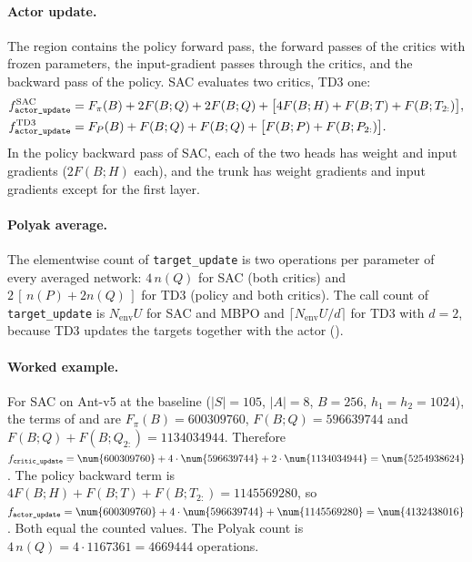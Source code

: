 \paragraph{Actor update.} The region contains the policy forward pass, the forward passes of the critics with frozen parameters, the input-gradient passes through the critics, and the backward pass of the policy.
SAC evaluates two critics, TD3 one:
\begin{align}
  f_{\texttt{actor\_\allowbreak update}}^{\mathrm{SAC}} &= F_\pi(B) + 2F(B;Q) + 2F(B;Q) + \bigl[4F(B;H)+F(B;T)+F(B;T_{2:})\bigr] ,\label{eq:app-actor-sac}\\
  f_{\texttt{actor\_\allowbreak update}}^{\mathrm{TD3}} &= F_P(B) + F(B;Q) + F(B;Q) + \bigl[F(B;P)+F(B;P_{2:})\bigr] .\label{eq:app-actor-td3}
\end{align}
In the policy backward pass of SAC, each of the two heads has weight and input gradients ($2F(B;H)$ each), and the trunk has weight gradients and input gradients except for the first layer.

\paragraph{Polyak average.} The elementwise count of \texttt{target\_\allowbreak update} is two operations per parameter of every averaged network: $4\,n(Q)$ for SAC (both critics) and $2\,[\,n(P)+2n(Q)\,]$ for TD3 (policy and both critics).
The call count of \texttt{target\_\allowbreak update} is $N_{\mathrm{env}}U$ for SAC and MBPO and $\lceil N_{\mathrm{env}}U/d\rceil$ for TD3 with $d=2$, because TD3 updates the targets together with the actor ().

\paragraph{Worked example.} For SAC on Ant-v5 at the baseline ($|S|=105$, $|A|=8$, $B=256$, $h_1=h_2=1024$), the terms of  and  are $F_\pi(B)=\num{600309760}$, $F(B;Q)=\num{596639744}$ and $F(B;Q)+F(B;Q_{2:})=\num{1134034944}$.
Therefore $f_{\texttt{critic\_\allowbreak update}}=\num{600309760}+4\cdot\num{596639744}+2\cdot\num{1134034944}=\num{5254938624}$.
The policy backward term is $4F(B;H)+F(B;T)+F(B;T_{2:})=\num{1145569280}$, so $f_{\texttt{actor\_\allowbreak update}}=\num{600309760}+4\cdot\num{596639744}+\num{1145569280}=\num{4132438016}$.
Both equal the counted values.
The Polyak count is $4\,n(Q)=4\cdot\num{1167361}=\num{4669444}$ operations.

